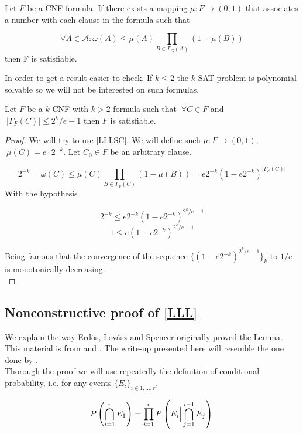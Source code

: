 \begin{corollary}\label{LLLSC}
	Let $F$ be a CNF formula. If there exists a mapping $\mu:F\to (0,1)$ that associates a number with each clause in the formula such that 
	
	$$
\forall A \in \mathcal{A} : \omega (A) \le \mu(A) \prod_{B\in\Gamma_G(A)} (1-\mu(B))
$$
	then F is satisfiable.
\end{corollary}


In order to get a result easier to check. If $k\le 2$ the $k$-SAT problem is  polynomial solvable so we will not be interested on such formulas.

\begin{corollary}
	Let $F$ be a $k$-CNF with $k>2$ formula such that $\ \forall C \in F$ and $\ |\Gamma_F(C)|\le 2^k/e-1$ then $F$ is satisfiable.
\end{corollary}
\begin{proof}
	
	 We will try to use \ref{LLLSC}. We will define such $\mu: F \to (0,1),$$\ \mu(C)=e\cdot 2^{-k}$. Let $C_0\in F$ be an arbitrary clause.
	 
	 \[
	 2^{-k}=\omega(C)\le  \mu(C) \prod_{B\in\Gamma_F(C)} (1-\mu(B)) = e2^{-k}(1-e 2^{-k})^{|\Gamma_F(C)|}
	 \]
	 With the hypothesis
	 
	\[
		 2^{-k} \le  e 2^{-k}(1-e2^{-k})^{2^k/e-1}\]\[
		 1  \le e(1-e2^{-k})^{2^k/e-1}
	\]
	
	Being famous that the convergence of the sequence $\{(1-e2^{-k})^{2^k/e-1}\}_k$ to $1/e$ is monotonically decreasing.\\
\end{proof}



\subsection{Nonconstructive proof of \ref{LLL}}

We explain the way Erdös, Lovász and Spencer originally proved the Lemma. This material is from \cite{erdos1973problems} and \cite{spencer1977asymptotic}. The write-up presented here will resemble the one done by \cite{moser2013exact}.\\



Thorough the proof we will use repeatedly the definition of conditional probability, i.e. for any events $\{E_i\}_{i\in 1,...,r}$,

\[
P\left ( \bigcap_{i=1}^r E_1\right ) = \prod_{i=1}^rP \left( E_i \Big | \bigcap_{j=1}^{i-1} E_j\right)\\
\]

